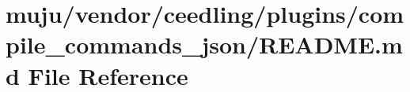 \hypertarget{vendor_2ceedling_2plugins_2compile__commands__json_2_r_e_a_d_m_e_8md}{}\section{muju/vendor/ceedling/plugins/compile\+\_\+commands\+\_\+json/\+R\+E\+A\+D\+ME.md File Reference}
\label{vendor_2ceedling_2plugins_2compile__commands__json_2_r_e_a_d_m_e_8md}
